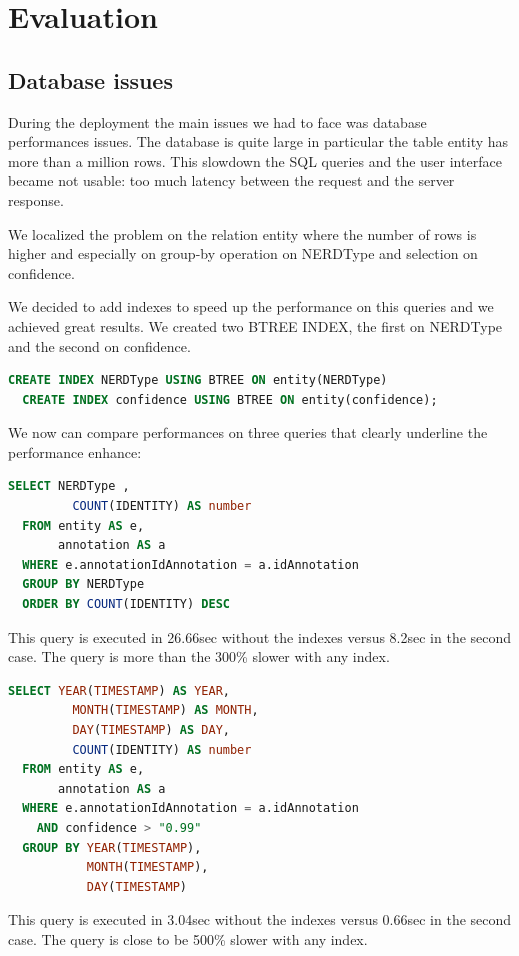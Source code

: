\documentclass[a4paper,13pt]{report}
\begin{document}
\chapter{Evaluation} %
\label{cha:evaluation}
\section{Database issues}
During the deployment the main issues we had to face was database performances issues.
The database is quite large in particular the table entity has more than a million rows. This slowdown the SQL queries and the user interface became not usable: too much latency between the request and the server response.

We localized the problem on the relation entity where the number of rows is higher and especially on group-by operation on NERDType and selection on confidence.


We decided to add indexes to speed up the performance on this queries and we achieved great results.
We created two BTREE INDEX, the first on NERDType and the second on confidence.
\vspace{0.4cm}
        \begin{lstlisting}[language=SQL]
  CREATE INDEX NERDType USING BTREE ON entity(NERDType)
  CREATE INDEX confidence USING BTREE ON entity(confidence); 
        \end{lstlisting}
\vspace{0.9cm}
We now can compare performances on three queries that clearly underline the performance enhance:
\vspace{0.3cm}
        \begin{lstlisting}[language=SQL]
  SELECT NERDType ,
         COUNT(IDENTITY) AS number
  FROM entity AS e,
       annotation AS a
  WHERE e.annotationIdAnnotation = a.idAnnotation
  GROUP BY NERDType
  ORDER BY COUNT(IDENTITY) DESC 
        \end{lstlisting}
\vspace{0.3cm}
This query is executed in 26.66sec without the indexes versus 8.2sec in the second case. The query is more than the 300\% slower with any index.

\vspace{0.9cm}
        \begin{lstlisting}[language=SQL]
   SELECT YEAR(TIMESTAMP) AS YEAR,
         MONTH(TIMESTAMP) AS MONTH,
         DAY(TIMESTAMP) AS DAY,
         COUNT(IDENTITY) AS number
  FROM entity AS e,
       annotation AS a
  WHERE e.annotationIdAnnotation = a.idAnnotation
    AND confidence > "0.99"
  GROUP BY YEAR(TIMESTAMP),
           MONTH(TIMESTAMP),
           DAY(TIMESTAMP) 
        \end{lstlisting}
\vspace{0.3cm}
This query is executed in 3.04sec without the indexes versus 0.66sec in the second case. The query is close to be 500\% slower with any index.
\end{document}
